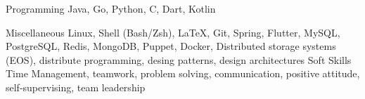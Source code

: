 

\begin{cvskills}

  \cvskill
    {Programming} %
    {Java, Go, Python, C, Dart, Kotlin} %

  \cvskill
    {Miscellaneous} %
    {Linux, Shell (Bash/Zsh), \LaTeX, Git, Spring, Flutter, MySQL, PostgreSQL, Redis, MongoDB, Puppet, Docker, Distributed storage systems (EOS), distribute programming, desing patterns, design architectures} %
  \cvskill
    {Soft Skills} %
    {Time Management, teamwork, problem solving, communication, positive attitude, self-supervising, team leadership} %

\end{cvskills}
